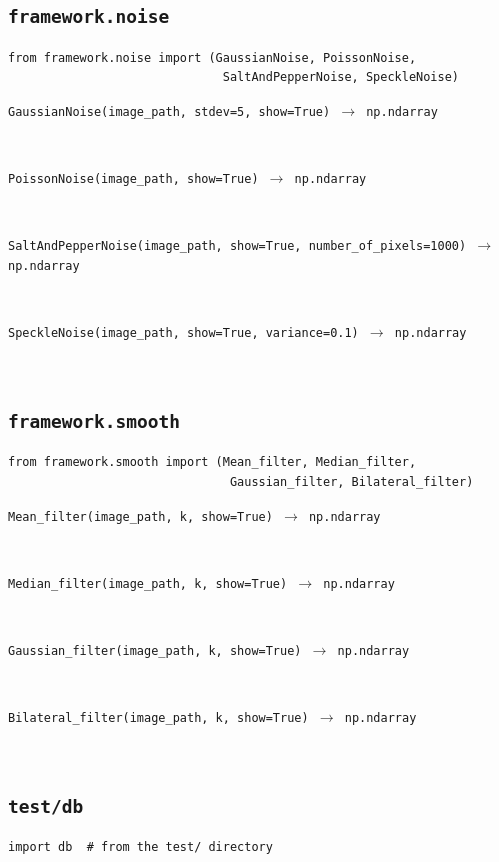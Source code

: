 \documentclass[12pt,a4paper]{article}
\newcommand{\cs}[1]{\texttt{#1}}          %
\begin{document}
\subsection{\texttt{framework.noise}}

\begin{lstlisting}[style=python]
from framework.noise import (GaussianNoise, PoissonNoise,
                              SaltAndPepperNoise, SpeckleNoise)
\end{lstlisting}

\begin{description}
  \item[\cs{GaussianNoise(image\_path, stdev=5, show=True) $\to$ np.ndarray}] ~
  \item[\cs{PoissonNoise(image\_path, show=True) $\to$ np.ndarray}] ~
  \item[\cs{SaltAndPepperNoise(image\_path, show=True, number\_of\_pixels=1000) $\to$ np.ndarray}] ~
  \item[\cs{SpeckleNoise(image\_path, show=True, variance=0.1) $\to$ np.ndarray}] ~
\end{description}

\subsection{\texttt{framework.smooth}}

\begin{lstlisting}[style=python]
from framework.smooth import (Mean_filter, Median_filter,
                               Gaussian_filter, Bilateral_filter)
\end{lstlisting}

\begin{description}
  \item[\cs{Mean\_filter(image\_path, k, show=True) $\to$ np.ndarray}] ~
  \item[\cs{Median\_filter(image\_path, k, show=True) $\to$ np.ndarray}] ~
  \item[\cs{Gaussian\_filter(image\_path, k, show=True) $\to$ np.ndarray}] ~
  \item[\cs{Bilateral\_filter(image\_path, k, show=True) $\to$ np.ndarray}] ~
\end{description}

\subsection{\texttt{test/db}}

\begin{lstlisting}[style=python]
import db  # from the test/ directory
\end{lstlisting}
\end{document}
